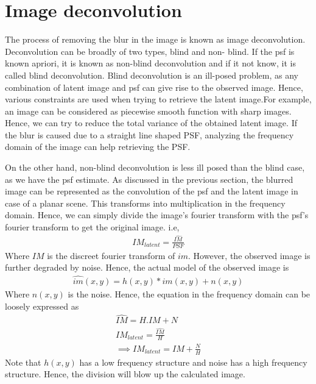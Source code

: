 \documentclass[BTech]{iitmdiss}
\begin{document}
\section{Image deconvolution}
\label{basic_theory:deconv}
The process of removing the blur in the image is known as image
deconvolution. Deconvolution can be broadly of two types, blind and non-
blind. If the psf is known apriori, it is known as non-blind 
deconvolution and if it not know, it is called blind deconvolution. 
Blind deconvolution is an ill-posed problem, as any combination of 
latent image and psf can give rise to the observed image. Hence, various
constraints are used when trying to retrieve the latent image\cite{fergus2006removing, krishnan2009fast, levin2007deconvolution,gupta2010single}.For example, an image can be considered as piecewise smooth function with
sharp images. Hence, we can try to reduce the total variance of the 
obtained latent image\cite{money2006total,chan1998total}. If the blur
is caused due to a straight line shaped PSF, analyzing the frequency
domain of the image can help retrieving the PSF\cite{oliveira2007blind}.

On the other hand, non-blind deconvolution is less ill posed than the
blind case, as we have the psf estimate. As discussed in the previous 
section, the blurred image can be represented as the convolution of 
the psf and the latent image in case of a planar scene. This 
transforms into multiplication in the frequency domain. Hence, we can
simply divide the image's fourier transform with the psf's fourier
transform to get the original image. i.e,
\begin{align*}
IM_{latent} = \frac{\hat{IM}}{PSF}
\end{align*}
Where $IM$ is the discreet fourier transform of $im$. However, the 
observed image is further degraded by noise. Hence, the actual model of
the observed image is
\begin{align*}
\hat{im}(x,y) = h(x,y)*im(x,y) + n(x,y) 
\end{align*}
Where $n(x,y)$ is the noise. Hence, the equation in the frequency domain
can be loosely expressed as
\begin{align*}
\hat{IM} = H.IM + N\\
IM_{latent} = \frac{\hat{IM}}{H}\\
\implies IM_{latent} = IM + \frac{N}{H}
\end{align*}
Note that $h(x,y)$ has a low frequency structure and noise has a high 
frequency structure. Hence, the division will blow up the calculated 
image. 
\end{document}
